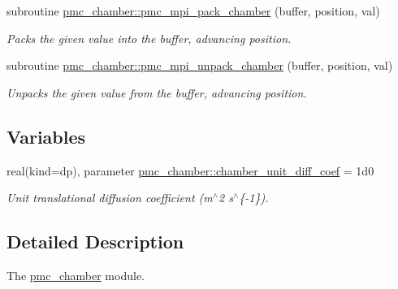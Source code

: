\begin{DoxyCompactItemize}
subroutine \mbox{\hyperlink{namespacepmc__chamber_af292d166f534af98e8c56c9b45d82909}{pmc\+\_\+chamber\+::pmc\+\_\+mpi\+\_\+pack\+\_\+chamber}} (buffer, position, val)
\begin{DoxyCompactList}\small\item\em Packs the given value into the buffer, advancing position. \end{DoxyCompactList}\item 
subroutine \mbox{\hyperlink{namespacepmc__chamber_a20b7398d417e3934836033c151046fe7}{pmc\+\_\+chamber\+::pmc\+\_\+mpi\+\_\+unpack\+\_\+chamber}} (buffer, position, val)
\begin{DoxyCompactList}\small\item\em Unpacks the given value from the buffer, advancing position. \end{DoxyCompactList}\end{DoxyCompactItemize}
\subsection*{Variables}
\begin{DoxyCompactItemize}
\item 
real(kind=dp), parameter \mbox{\hyperlink{namespacepmc__chamber_a1ce68b9e5f462ab5f363ba40ee8a2a2b}{pmc\+\_\+chamber\+::chamber\+\_\+unit\+\_\+diff\+\_\+coef}} = 1d0
\begin{DoxyCompactList}\small\item\em Unit translational diffusion coefficient (m$^\wedge$2 s$^\wedge$\{-\/1\}). \end{DoxyCompactList}\end{DoxyCompactItemize}


\subsection{Detailed Description}
The \mbox{\hyperlink{namespacepmc__chamber}{pmc\+\_\+chamber}} module. 

